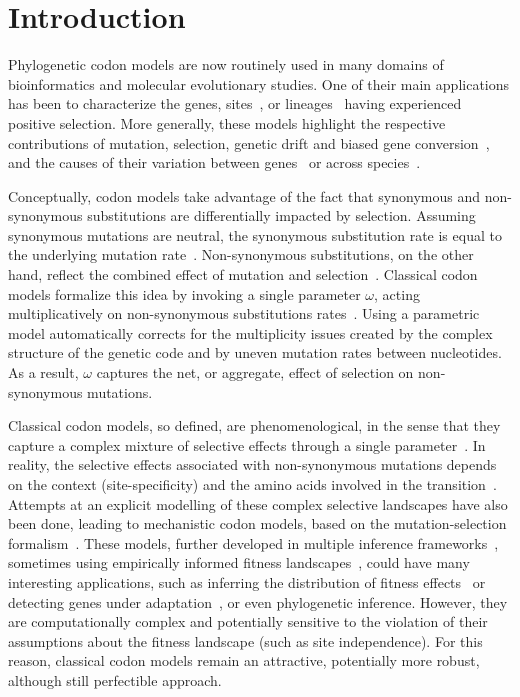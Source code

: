 \section{Introduction}

Phylogenetic \gls{codon} models are now routinely used in many domains of bioinformatics and molecular evolutionary studies.
One of their main applications has been to characterize the genes, sites~\citep{Nielsen1998}, or lineages~\citep{Zhang2004} having experienced positive selection.
More generally, these models highlight the respective contributions of mutation, selection, \gls{genetic drift} and biased gene conversion~\citep{Kosiol2019}, and the causes of their variation between genes~\citep{Zhang2015} or across species~\citep{Lartillot2011}.

Conceptually, \gls{codon} models take advantage of the fact that \gls{synonymous} and \gls{non-synonymous} \glspl{substitution} are differentially impacted by selection.
Assuming \gls{synonymous} mutations are \gls{neutral}, the \gls{synonymous} \gls{substitution} rate is equal to the underlying mutation rate~\citep{kimura1983neutral}.
Non-synonymous \glspl{substitution}, on the other hand, reflect the combined effect of mutation and selection~\citep{Ohta1995}.
Classical \gls{codon} models formalize this idea by invoking a single parameter $\omega$, acting multiplicatively on \gls{non-synonymous} \glspl{substitution} rates~\citep{Muse1994, Goldman1994}.
Using a parametric model automatically corrects for the multiplicity issues created by the complex structure of the genetic code and by uneven mutation rates between nucleotides.
As a result, $\omega$ captures the net, or aggregate, effect of selection on \gls{non-synonymous} mutations.

Classical \gls{codon} models, so defined, are phenomenological, in the sense that they capture a complex mixture of selective effects through a single parameter~\citep{Rodrigue2010a}.
In reality, the selective effects associated with \gls{non-synonymous} mutations depends on the context (site-specificity) and the amino acids involved in the transition~\citep{Kosiol2007}.
Attempts at an explicit modelling of these complex selective landscapes have also been done, leading to mechanistic \gls{codon} models, based on the mutation-selection formalism~\citep{Halpern1998}.
These models, further developed in multiple inference frameworks~\citep{Rodrigue2010, Tamuri2012}, sometimes using empirically informed fitness landscapes~\citep{Bloom2014}, could have many interesting applications, such as inferring the distribution of fitness effects~\citep{Tamuri2012} or detecting genes under adaptation~\citep{Rodrigue2016}, or even phylogenetic inference.
However, they are computationally complex and potentially sensitive to the violation of their assumptions about the fitness landscape (such as site independence).
For this reason, classical \gls{codon} models remain an attractive, potentially more robust, although still perfectible approach.

